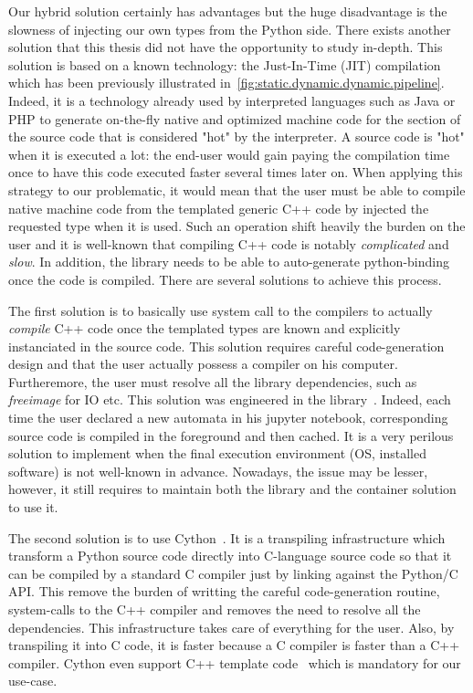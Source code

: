 Our hybrid solution certainly has advantages but the huge disadvantage is the slowness of injecting our own types from
the Python side. There exists another solution that this thesis did not have the opportunity to study in-depth. This
solution is based on a known technology: the Just-In-Time (JIT) compilation which has been previously illustrated
in~\cref{fig:static.dynamic.dynamic.pipeline}. Indeed, it is a technology already used by interpreted languages such as
Java or PHP to generate on-the-fly native and optimized machine code for the section of the source code that is
considered "hot" by the interpreter. A source code is "hot" when it is executed a lot: the end-user would gain paying
the compilation time once to have this code executed faster several times later on. When applying this strategy to our
problematic, it would mean that the user must be able to compile native machine code from the templated generic C++ code
by injected the requested type when it is used. Such an operation shift heavily the burden on the user and it is
well-known that compiling C++ code is notably \emph{complicated} and \emph{slow}. In addition, the library needs to be
able to auto-generate python-binding once the code is compiled. There are several solutions to achieve this process.

The first solution is to basically use system call to the compilers to actually \emph{compile} C++ code once the
templated types are known and explicitly instanciated in the source code. This solution requires careful code-generation
design and that the user actually possess a compiler on his computer. Furtheremore, the user must resolve all the
library dependencies, such as \emph{freeimage} for IO etc. This solution was engineered in the
library~\parencite{demaille.2013.vcsn}. Indeed, each time the user declared a new automata in his jupyter notebook,
corresponding source code is compiled in the foreground and then cached. It is a very perilous solution to implement
when the final execution environment (OS, installed software) is not well-known in advance. Nowadays, the issue may be
lesser, however, it still requires to maintain both the library and the container solution to use it.

The second solution is to use Cython~\parencite{behnel.2010.cython}. It is a transpiling infrastructure which transform
a Python source code directly into C-language source code so that it can be compiled by a standard C compiler just by
linking against the Python/C API. This remove the burden of writting the careful code-generation routine, system-calls
to the C++ compiler and removes the need to resolve all the dependencies. This infrastructure takes care of everything
for the user. Also, by transpiling it into C code, it is faster because a C compiler is faster than a C++ compiler.
Cython even support C++ template code~\parencite{behnel.2022.cython-template} which is mandatory for our use-case.

